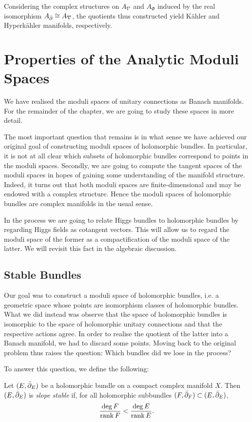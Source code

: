 \documentclass[12pt]{ociamthesis}  %
\begin{document}
Considering the complex structures on $A_\nabla$ and $A_\Phi$ induced
by the real isomorphism $A_{\bar{\partial}}\cong A_\nabla$, the quotients
thus constructed yield K\"ahler and Hyperk\"ahler manifolds, respectively.

\section{Properties of the Analytic Moduli Spaces}\label{sec:properties_of_analytic_spaces}

We have realised the moduli spaces of unitary connections as
Banach manifolds. For the remainder of the chapter, we are going to
study these spaces in more detail.

The most important question that remains is in what sense we have
achieved our original goal of constructing moduli spaces of
holomorphic bundles. In particular, it is not at all clear which subsets
of holomorphic bundles correspond to points in the moduli spaces.
Secondly, we are going to compute the tangent spaces of the moduli
spaces in hopes of gaining some understanding of the manifold structure.
Indeed, it turns out that both moduli spaces are finite-dimensional
and may be endowed with a complex structure. Hence the moduli spaces
of holomorphic bundles are complex manifolds in the usual sense.

In the process we are going to relate Higgs bundles to holomorphic bundles
by regarding Higgs fields as cotangent vectors. This will allow us to
regard the moduli space of the former as a compactification of the moduli
space of the latter. We will revisit this fact in the algebraic discussion.

\subsection{Stable Bundles}\label{sec:analytic_stable_bundles}

Our goal was to construct a moduli space of holomorphic bundles,
i.e. a geometric space whose points are isomorphism classes of
holomorphic bundles. What we did instead was observe that the space
of holomorphic bundles is isomorphic to the space of holomorphic unitary
connections and that the respective actions agree. In order to realise
the quotient of the latter into a Banach manifold, we had to discard
some points. Moving back to the original problem thus raises
the question: Which bundles did we lose in the process?

To answer this question, we define the following:
\begin{definition}\label{def:stable_bundle}
  Let $(E,{\bar{\partial}}_E)$ be a holomorphic bundle on a compact complex
  manifold $X$. Then $(E,{\bar{\partial}}_E)$ is \emph{slope stable}
  if, for all holomorphic subbundles
  $(F,{\bar{\partial}}_F)\subset (E,{\bar{\partial}}_E)$,
  \begin{align}\label{eq:stability}
    \frac{\deg F}{\operatorname{rank} F} < \frac{\deg E}{\operatorname{rank} E}.
  \end{align}
\end{definition}
\end{document}
